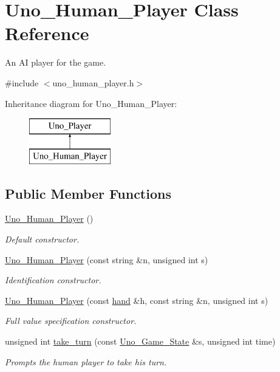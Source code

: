 \hypertarget{class_uno___human___player}{
\section{\-Uno\-\_\-\-Human\-\_\-\-Player \-Class \-Reference}
\label{class_uno___human___player}
}


\-An \-A\-I player for the game.  




{\ttfamily \#include $<$uno\-\_\-human\-\_\-player.\-h$>$}

\-Inheritance diagram for \-Uno\-\_\-\-Human\-\_\-\-Player\-:\begin{figure}[H]
\begin{center}
\leavevmode
\includegraphics[height=2.000000cm]{class_uno___human___player}
\end{center}
\end{figure}
\subsection*{\-Public \-Member \-Functions}
\begin{DoxyCompactItemize}
\item 
\hyperlink{class_uno___human___player_a7339947e9ae326b26ccd478c2aa23664}{\-Uno\-\_\-\-Human\-\_\-\-Player} ()
\begin{DoxyCompactList}\small\item\em \-Default constructor. \end{DoxyCompactList}\item 
\hyperlink{class_uno___human___player_a126f7617c19e1ff7ca5db185b5b47735}{\-Uno\-\_\-\-Human\-\_\-\-Player} (const string \&n, unsigned int s)
\begin{DoxyCompactList}\small\item\em \-Identification constructor. \end{DoxyCompactList}\item 
\hyperlink{class_uno___human___player_a3ee62bf00689e7e4f435c42bfc56b0a6}{\-Uno\-\_\-\-Human\-\_\-\-Player} (const \hyperlink{uno__player_8h_acd9523c15e47a87e3740cf5ade73556e}{hand} \&h, const string \&n, unsigned int s)
\begin{DoxyCompactList}\small\item\em \-Full value specification constructor. \end{DoxyCompactList}\item 
unsigned int \hyperlink{class_uno___human___player_a7c0db1f85612347a71960813cce68017}{take\-\_\-turn} (const \hyperlink{class_uno___game___state}{\-Uno\-\_\-\-Game\-\_\-\-State} \&s, unsigned int time)
\begin{DoxyCompactList}\small\item\em \-Prompts the human player to take his turn. \end{DoxyCompactList}\end{DoxyCompactItemize}


